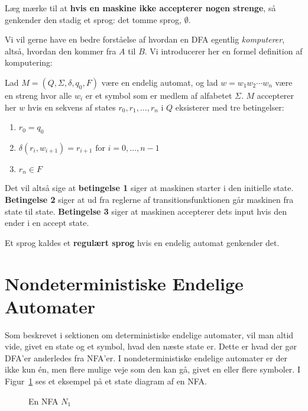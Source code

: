 Læg mærke til at \textbf{hvis en maskine ikke accepterer nogen strenge}, så genkender den stadig et sprog: det tomme sprog, $\emptyset$.

Vi vil gerne have en bedre forståelse af hvordan en DFA egentlig \textit{komputerer}, altså, hvordan den kommer fra $A$ til $B$. Vi introducerer her en formel definition af komputering:

\begin{definition}
\label{def:DFAKomputering}
  Lad $M = (Q, \Sigma, \delta, q_{0}, F)$ være en endelig automat, og lad $w = w_{1}w_{2} \cdots w_{n}$ være en streng hvor alle $w_i$ er et symbol som er medlem af alfabetet $\Sigma$. $M$ accepterer her $w$ hvis en sekvens af states $r_{0}, r_{1}, \ldots, r_{n}$ i $Q$ eksisterer med tre betingelser:
  \begin{enumerate}
    \item $r_{0} = q_{0}$
    \item $\delta(r_{i}, w_{i+1}) = r_{i+1} \text{ for } i = 0, \ldots, n-1$
    \item $r_{n} \in F$
  \end{enumerate}
\end{definition}

Det vil altså sige at \textbf{betingelse 1} siger at maskinen starter i den initielle state. \textbf{Betingelse 2} siger at ud fra reglerne af transitionsfunktionen går maskinen fra state til state. \textbf{Betingelse 3} siger at maskinen accepterer dets input hvis den ender i en accept state.

\begin{definition}
Et sprog kaldes et \textbf{regulært sprog} hvis en endelig automat genkender det.
\end{definition}


\newpage
\section{Nondeterministiske Endelige Automater}

Som beskrevet i sektionen om deterministiske endelige automater, vil man altid vide, givet en state og et symbol, hvad den næste state er. Dette er hvad der gør DFA'er anderledes fra NFA'er. I nondeterministiske endelige automater er der ikke kun én, men flere mulige veje som den kan gå, givet en eller flere symboler. I Figur~\ref{fig:sipser1.27} ses et eksempel på et state diagram af en NFA.

\begin{figure}[ht]
  \centering
  \caption{\label{fig:sipser1.27} En NFA $N_{1}$}
\end{figure}

